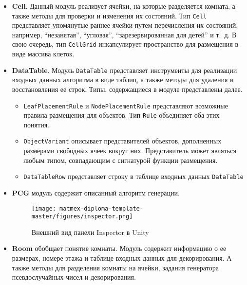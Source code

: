 \begin{itemize}

    \item \textbf{Cell}. Данный модуль реализует ячейки, на которые разделяется комната, а также методы для проверки и изменения их состояний. Тип \texttt{Cell} представляет упомянутые раннее ячейки путем перечисления их состояний, например, \enquote{незанятая}, \enquote{угловая}, \enquote{зарезервированная для детей} и т.~д. В свою очередь, тип \texttt{CellGrid} инкапсулирует пространство для размещения в виде массива клеток. 
    
    \item \textbf{DataTable}. Модуль \texttt{DataTable} представляет инструменты для реализации входных данных алгоритма в виде таблиц, а также методы для удаления и восстановления ее строк. Типы, содержащиеся в модуле представлены далее.
        \begin{itemize}
            \item \texttt{LeafPlacementRule} и \texttt{NodePlacementRule} представляют возможные правила размещения для объектов. Тип \texttt{Rule} объединяет оба этих понятия.
    
            \item \texttt{ObjectVariant} описывает представителей объектов, дополненных размерами свободных ячеек вокруг них. Представитель может являться любым типом, совпадающим с сигнатурой функции размещения.
            
            \item \texttt{DataTableRow} представляет строку в таблице входных данных \texttt{DataTable}
        \end{itemize}
    
    \item \textbf{PCG} модуль содержит описанный алгоритм генерации.

    \begin{figure}
        \centering
        \texttt{[image: matmex-diploma-template-master/figures/inspector.png]}
        \caption{Внешний вид панели Inspector в Unity}
        \label{fig:inspector}
    \end{figure}

    \item \textbf{Room} обобщает понятие комнаты. Модуль содержит информацию о ее размерах, номере этажа и таблице входных данных для декорирования. А также методы для разделения комнаты на ячейки, задания генератора псевдослучайных чисел и декорирования.
    

\end{itemize}
